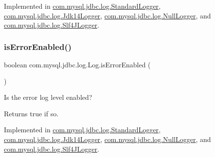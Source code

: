 Implemented in \mbox{\hyperlink{classcom_1_1mysql_1_1jdbc_1_1log_1_1_standard_logger_a0072ae8133e26e8422791592ea7724da}{com.\+mysql.\+jdbc.\+log.\+Standard\+Logger}}, \mbox{\hyperlink{classcom_1_1mysql_1_1jdbc_1_1log_1_1_jdk14_logger_ad924ecc59554c92596222f2952d5d65c}{com.\+mysql.\+jdbc.\+log.\+Jdk14\+Logger}}, \mbox{\hyperlink{classcom_1_1mysql_1_1jdbc_1_1log_1_1_null_logger_a4d03ecff15bd998bbffd11a684e561b5}{com.\+mysql.\+jdbc.\+log.\+Null\+Logger}}, and \mbox{\hyperlink{classcom_1_1mysql_1_1jdbc_1_1log_1_1_slf4_j_logger_a3c624bc8c184e4d8790c3ee768492674}{com.\+mysql.\+jdbc.\+log.\+Slf4\+J\+Logger}}.

\mbox{\label{interfacecom_1_1mysql_1_1jdbc_1_1log_1_1_log_aece1d483e86ea84bd1553ed993c56c59}} 
\subsubsection{\texorpdfstring{is\+Error\+Enabled()}{isErrorEnabled()}}
{\footnotesize\ttfamily boolean com.\+mysql.\+jdbc.\+log.\+Log.\+is\+Error\+Enabled (\begin{DoxyParamCaption}{ }\end{DoxyParamCaption})}

Is the \textquotesingle{}error\textquotesingle{} log level enabled?

\begin{DoxyReturn}{Returns}
true if so. 
\end{DoxyReturn}


Implemented in \mbox{\hyperlink{classcom_1_1mysql_1_1jdbc_1_1log_1_1_standard_logger_a58e4e9a985cc55c3a1612588af36dcbf}{com.\+mysql.\+jdbc.\+log.\+Standard\+Logger}}, \mbox{\hyperlink{classcom_1_1mysql_1_1jdbc_1_1log_1_1_jdk14_logger_af21aea05fb62e1895801a086bf33c2f6}{com.\+mysql.\+jdbc.\+log.\+Jdk14\+Logger}}, \mbox{\hyperlink{classcom_1_1mysql_1_1jdbc_1_1log_1_1_null_logger_a8d58edceeb939928c01ae93a4c62dfd5}{com.\+mysql.\+jdbc.\+log.\+Null\+Logger}}, and \mbox{\hyperlink{classcom_1_1mysql_1_1jdbc_1_1log_1_1_slf4_j_logger_aeadc840396cd428c64ca320c2a0c9e5c}{com.\+mysql.\+jdbc.\+log.\+Slf4\+J\+Logger}}.

\mbox{\label{interfacecom_1_1mysql_1_1jdbc_1_1log_1_1_log_acc3f527d8a1e3143e312eb4368c3632a}} 
